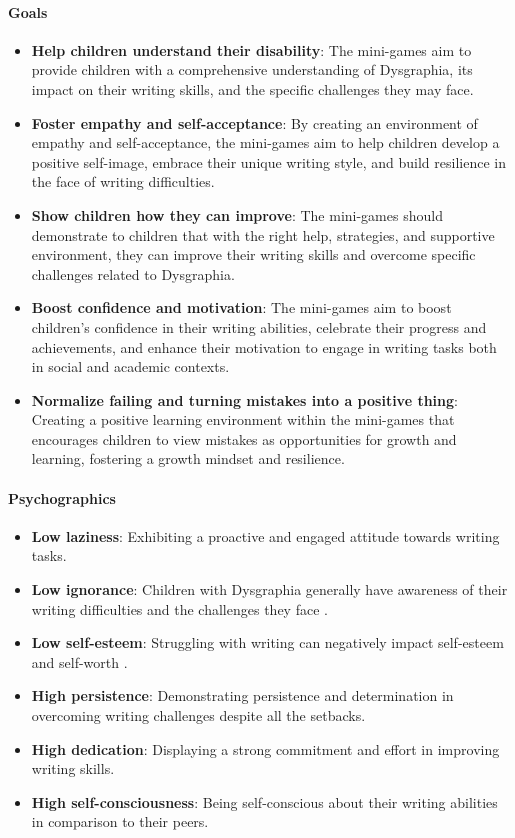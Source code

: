 \paragraph{Goals}
\begin{itemize}
    \item \textbf{Help children understand their disability}: The mini-games aim to provide children with a comprehensive understanding of Dysgraphia, its impact on their writing skills, and the specific challenges they may face.
    \item \textbf{Foster empathy and self-acceptance}: By creating an environment of empathy and self-acceptance, the mini-games aim to help children develop a positive self-image, embrace their unique writing style, and build resilience in the face of writing difficulties.
    \item \textbf{Show children how they can improve}: The mini-games should demonstrate to children that with the right help, strategies, and supportive environment, they can improve their writing skills and overcome specific challenges related to Dysgraphia.
    \item \textbf{Boost confidence and motivation}: The mini-games aim to boost children's confidence in their writing abilities, celebrate their progress and achievements, and enhance their motivation to engage in writing tasks both in social and academic contexts.
    \item \textbf{Normalize failing and turning mistakes into a positive thing}: Creating a positive learning environment within the mini-games that encourages children to view mistakes as opportunities for growth and learning, fostering a growth mindset and resilience.
\end{itemize}

\paragraph{Psychographics}
\begin{itemize}
    \item \textbf{Low laziness}: Exhibiting a proactive and engaged attitude towards writing tasks.
    \item \textbf{Low ignorance}: Children with Dysgraphia generally have awareness of their writing difficulties and the challenges they face \cite{cleveland_dysgraphia}.
    \item \textbf{Low self-esteem}: Struggling with writing can negatively impact self-esteem and self-worth \cite{cleveland_dysgraphia}.
    \item \textbf{High persistence}: Demonstrating persistence and determination in overcoming writing challenges despite all the setbacks.
    \item \textbf{High dedication}: Displaying a strong commitment and effort in improving writing skills.
    \item \textbf{High self-consciousness}: Being self-conscious about their writing abilities in comparison to their peers.
\end{itemize}

